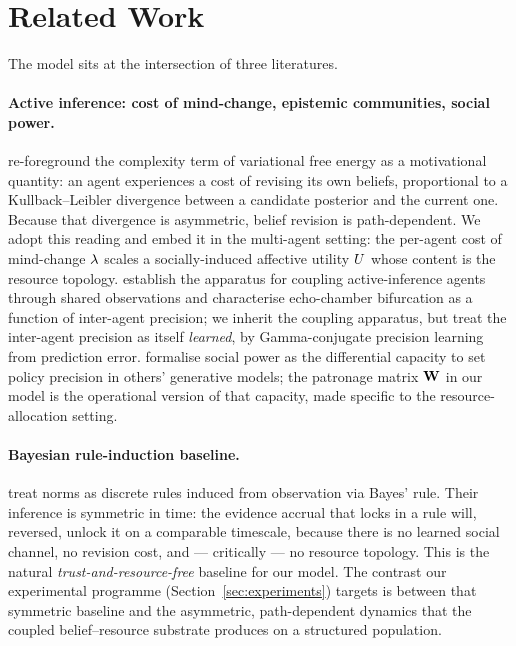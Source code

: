 \section{Related Work}
\label{sec:related}

The model sits at the intersection of three literatures.

\paragraph{Active inference: cost of mind-change, epistemic
communities, social power.}
\citet{hylandAlbarracin2025MindChange} re-foreground the complexity
term of variational free energy as a motivational quantity: an agent
experiences a cost of revising its own beliefs, proportional to a
Kullback--Leibler divergence between a candidate posterior and the
current one. Because that divergence is asymmetric, belief revision is
path-dependent. We adopt this reading and embed it in the multi-agent
setting: the per-agent cost of mind-change $\lambda$ scales a
socially-induced affective utility $U$ whose content is the
resource topology. \citet{albarracin2022EpistemicCommunities} establish
the apparatus for coupling active-inference agents through shared
observations and characterise echo-chamber bifurcation as a function
of inter-agent precision; we inherit the coupling apparatus, but treat
the inter-agent precision as itself \emph{learned}, by Gamma-conjugate
precision learning from prediction error.
\citet{albarracin2025SocialPower} formalise social power as the
differential capacity to set policy precision in others' generative
models; the patronage matrix $\mathbf{W}$ in our model is the
operational version of that capacity, made specific to the
resource-allocation setting.

\paragraph{Bayesian rule-induction baseline.}
\citet{oldenburgZhiXuan2024BayesianRule} treat norms as discrete rules
induced from observation via Bayes' rule. Their inference is symmetric
in time: the evidence accrual that locks in a rule will, reversed,
unlock it on a comparable timescale, because there is no learned
social channel, no revision cost, and --- critically --- no resource
topology. This is the natural \emph{trust-and-resource-free} baseline
for our model. The contrast our experimental programme
(Section~\ref{sec:experiments}) targets is between that symmetric
baseline and the asymmetric, path-dependent dynamics that the coupled
belief--resource substrate produces on a structured population.

